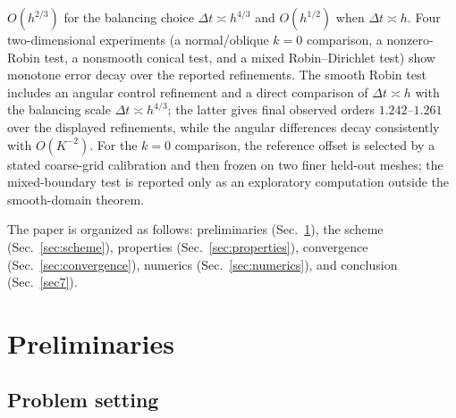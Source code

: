 \documentclass[11pt]{article}
\theoremstyle{definition}
\theoremstyle{remark}
\newcommand{\dt}{\Delta t}
\begin{document}
\begin{enumerate}[label=(\roman*)]
	$O(h^{2/3})$ for the balancing choice $\dt\asymp h^{4/3}$ and
	$O(h^{1/2})$ when $\dt\asymp h$.  Four two-dimensional experiments
	(a normal/oblique $k=0$ comparison, a nonzero-Robin test, a nonsmooth
	conical test, and a mixed Robin--Dirichlet test) show monotone error decay
	over the reported refinements.  The smooth Robin test includes an angular
	control refinement and a direct comparison of $\dt\asymp h$ with the
	balancing scale $\dt\asymp h^{4/3}$; the latter gives final observed orders
	$1.242$--$1.261$ over the displayed refinements, while the angular
	differences decay consistently with $O(K^{-2})$.
	For the $k=0$ comparison, the reference offset is selected by a stated
	coarse-grid calibration and then frozen on two finer held-out meshes; the
	mixed-boundary test is reported only as an exploratory computation outside
	the smooth-domain theorem.
	
\end{enumerate}

The paper is organized as follows: preliminaries (Sec.~\ref{sec:prelim}),
the scheme (Sec.~\ref{sec:scheme}), properties (Sec.~\ref{sec:properties}),
convergence (Sec.~\ref{sec:convergence}), numerics (Sec.~\ref{sec:numerics}),
and conclusion (Sec.~\ref{sec7}).



	
	\section{Preliminaries}
	\label{sec:prelim}
	
	\subsection{Problem setting}
	
\end{document}
